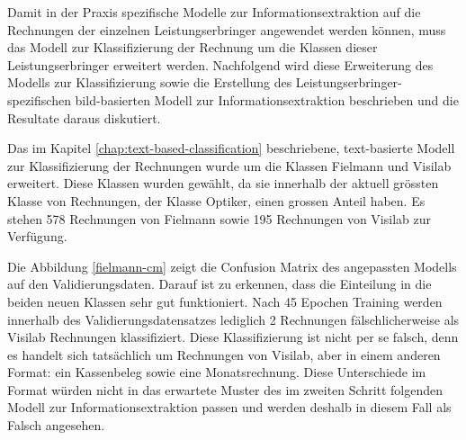 Damit in der Praxis spezifische Modelle zur Informationsextraktion auf die Rechnungen der einzelnen Leistungserbringer angewendet werden können, muss das Modell zur Klassifizierung der Rechnung um die Klassen dieser Leistungserbringer erweitert werden. Nachfolgend wird diese Erweiterung des Modells zur Klassifizierung sowie die Erstellung des Leistungserbringer-spezifischen bild-basierten Modell zur Informationsextraktion beschrieben und die Resultate daraus diskutiert.

Das im Kapitel \ref{chap:text-based-classification} beschriebene, text-basierte Modell zur Klassifizierung der Rechnungen wurde um die Klassen Fielmann und Visilab erweitert. Diese Klassen wurden gewählt, da sie innerhalb der aktuell grössten Klasse von Rechnungen, der Klasse Optiker, einen grossen Anteil haben. Es stehen 578 Rechnungen von Fielmann sowie 195 Rechnungen von Visilab zur Verfügung.

Die Abbildung \ref{fielmann-cm} zeigt die Confusion Matrix des angepassten Modells auf den Validierungsdaten. Darauf ist zu erkennen, dass die Einteilung in die beiden neuen Klassen sehr gut funktioniert. Nach 45 Epochen Training werden innerhalb des Validierungsdatensatzes lediglich 2 Rechnungen fälschlicherweise als Visilab Rechnungen klassifiziert. Diese Klassifizierung ist nicht per se falsch, denn es handelt sich tatsächlich um Rechnungen von Visilab, aber in einem anderen Format: ein Kassenbeleg sowie eine Monatsrechnung. Diese Unterschiede im Format würden nicht in das erwartete Muster des im zweiten Schritt folgenden Modell zur Informationsextraktion passen und werden deshalb in diesem Fall als Falsch angesehen.

